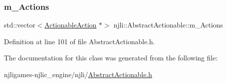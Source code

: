 \mbox{\label{classnjli_1_1_abstract_actionable_a17bc44206dd13cb179bafdf0cd2bbda9}} 
\subsubsection{\texorpdfstring{m\+\_\+\+Actions}{m\_Actions}}
{\footnotesize\ttfamily std\+::vector$<$\mbox{\hyperlink{structnjli_1_1_abstract_actionable_1_1_actionable_action}{Actionable\+Action}} $\ast$$>$ njli\+::\+Abstract\+Actionable\+::m\+\_\+\+Actions\hspace{0.3cm}{\ttfamily [private]}}



Definition at line 101 of file Abstract\+Actionable.\+h.



The documentation for this class was generated from the following file\+:\begin{DoxyCompactItemize}
\item 
njligames-\/njlic\+\_\+engine/njli/\mbox{\hyperlink{_abstract_actionable_8h}{Abstract\+Actionable.\+h}}\end{DoxyCompactItemize}
